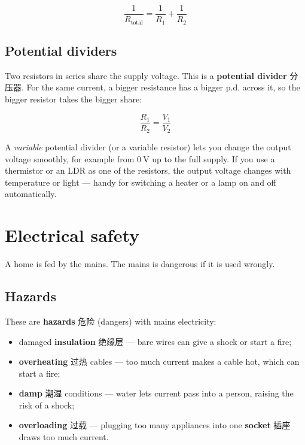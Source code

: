 \documentclass[11pt]{article}
\begin{document}
\[
\frac{1}{R_{\text{total}}} = \frac{1}{R_1} + \frac{1}{R_2}
\]

\subsection*{Potential dividers}

Two resistors in series share the supply voltage. This is a \textbf{potential divider} 分压器. For the same current, a bigger resistance has a bigger p.d. across it, so the bigger resistor takes the bigger share:

\[
\frac{R_1}{R_2} = \frac{V_1}{V_2}
\]

A \emph{variable} potential divider (or a variable resistor) lets you change the output voltage smoothly, for example from $0\ \text{V}$ up to the full supply. If you use a thermistor or an LDR as one of the resistors, the output voltage changes with temperature or light — handy for switching a heater or a lamp on and off automatically.

\section*{Electrical safety}

A home is fed by the mains. The mains is dangerous if it is used wrongly.

\subsection*{Hazards}

These are \textbf{hazards} 危险 (dangers) with mains electricity:

\begin{itemize}
\item damaged \textbf{insulation} 绝缘层 — bare wires can give a shock or start a fire;

\item \textbf{overheating} 过热 cables — too much current makes a cable hot, which can start a fire;

\item \textbf{damp} 潮湿 conditions — water lets current pass into a person, raising the risk of a shock;

\item \textbf{overloading} 过载 — plugging too many appliances into one \textbf{socket} 插座 draws too much current.

\end{itemize}
\end{document}
